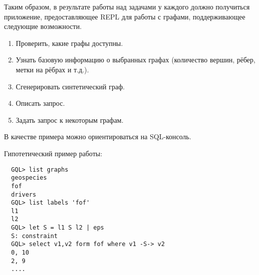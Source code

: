 Таким образом, в результате работы над задачами у каждого должно получиться приложение, предоставляющее REPL для работы с графами, поддерживающее следующие возможности.
\begin{enumerate}
\item Проверить, какие графы доступны.
\item Узнать базовую информацию о выбранных графах (количество вершин, рёбер, метки на рёбрах и т.д.).
\item Сгенерировать синтетический граф.
\item Описать запрос.
\item Задать запрос к некоторым графам.
\end{enumerate}
В качестве примера можно ориентироваться на SQL-консоль.

Гипотетический пример работы:
\begin{verbatim}
  GQL> list graphs
  geospecies
  fof
  drivers
  GQL> list labels 'fof'
  l1
  l2
  GQL> let S = l1 S l2 | eps
  S: constraint
  GQL> select v1,v2 form fof where v1 -S-> v2
  0, 10
  2, 9
  ....
\end{verbatim}


